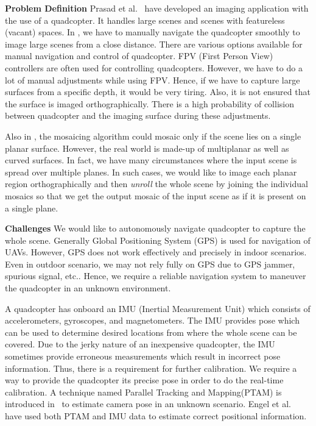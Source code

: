 \textbf{Problem Definition}
Prasad et al.~\cite{Prasad16} have developed an imaging application with the use
of a quadcopter. It handles large scenes and scenes with featureless (vacant)
spaces.
In \cite{Prasad16}, we have to manually navigate the quadcopter smoothly to
image large scenes from a close distance. There are various options available for manual
navigation and control of quadcopter. FPV (First Person View) controllers are
often used for controlling quadcopters. However, we have to do a lot of manual
adjustments while using FPV. Hence, if we have to capture large surfaces from a
specific depth, it would be very tiring. Also, it is not ensured that the
surface is imaged orthographically. There is a high probability of collision
between quadcopter and the imaging surface during these adjustments. 

Also in \cite{Prasad16}, the mosaicing algorithm could mosaic only if the scene
lies on a single planar surface. However, the real world is made-up of
multiplanar as well as curved surfaces. In fact, we have many circumstances where the input
scene is spread over multiple planes. In such cases, we would like to image each
planar region orthographically and then \textit{unroll} the whole scene by
joining the individual mosaics so that we get the output mosaic of the input scene as if it
is present on a single plane.
 
\textbf{Challenges}
We would like to autonomously navigate quadcopter to capture the whole scene.
Generally Global Positioning System (GPS) is used for navigation of UAVs. However, GPS
does not work effectively and precisely in indoor scenarios. Even in outdoor
scenario, we may not rely fully on GPS due to GPS jammer, spurious
signal, etc.. Hence, we require a reliable navigation system to maneuver the
quadcopter in an unknown environment.

A quadcopter has onboard an IMU (Inertial Measurement Unit)  which consists of
accelerometers, gyroscopes, and magnetometers. The IMU provides pose which can be
used to determine desired locations from where the whole scene can be covered.
Due to the jerky nature of an inexpensive quadcopter, the IMU sometimes
provide erroneous measurements  which result in incorrect pose information.
Thus, there is a requirement for further calibration. We require a way to
provide the quadcopter its precise pose in order to do the real-time calibration. A
technique named Parallel Tracking and Mapping(PTAM) is introduced
in~\cite{klein} to estimate camera pose in an unknown scenario. Engel et
al.~\cite{engel} have used both PTAM and IMU data to estimate correct
positional information.

